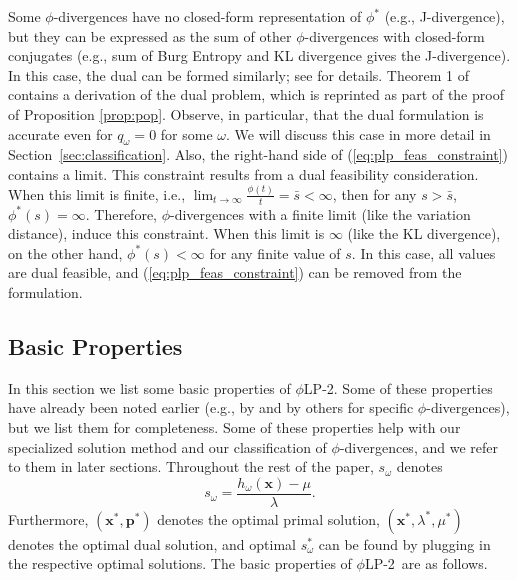 \documentclass[opre,nonblindrev]{informs3} %
\newcommand{\x}{\mathbf{x}}
\newcommand{\p}{\mathbf{p}}
\newcommand{\plp}{$\phi$LP-2}
\begin{document}
Some $\phi$-divergences have no closed-form representation of $\phi^*$ (e.g., J-divergence), but they can be expressed as the sum of other $\phi$-divergences with closed-form conjugates (e.g., sum of Burg Entropy and KL divergence gives the J-divergence). 
In this case, the dual can be formed similarly; see \cite{bental2011robust} for details.
Theorem 1 of \cite{bental2011robust} contains a derivation of the dual problem, which is reprinted as part of the proof of Proposition \ref{prop:pop}.
Observe, in particular, that the dual formulation is accurate even for $q_\omega = 0$ for some $\omega$.
We will discuss this case in more detail in Section~\ref{sec:classification}. 
Also, the right-hand side of (\ref{eq:plp_feas_constraint}) contains a limit.
This constraint results from a dual feasibility consideration. 
When this limit is finite, i.e., $\lim_{t \rightarrow \infty} \frac{\phi(t)}{t}=  \bar{s}<\infty$, then for any $s> \bar{s}$, $\phi^*(s)=\infty$. 
Therefore, $\phi$-divergences with a finite limit (like the variation distance), induce this constraint. 
When this limit is $\infty$ (like the KL divergence), on the other hand, $\phi^*(s)<\infty$ for any finite value of $s$. 
In this case, all values are dual feasible, and (\ref{eq:plp_feas_constraint}) can be removed from the formulation. 



\subsection{Basic Properties}
\label{ssec:basicprop}

In this section we list some basic properties of \plp.
Some of these properties have already been noted earlier (e.g., by \citet{bental2011robust} and by others for specific $\phi$-divergences), but we list them for completeness.
Some of these properties help with our specialized solution method and our classification of $\phi$-divergences, and we refer to them in later sections.
Throughout the rest of the paper, $s_\omega$ denotes
\begin{equation*}
	s_\omega = \frac{h_\omega(\x) - \mu}{\lambda}. %
\end{equation*}
Furthermore, $(\x^*, \p^*)$ denotes the optimal primal solution, $(\x^*, \lambda^*, \mu^*)$ denotes the optimal dual solution, and optimal $s_\omega^*$ can be found by plugging in the respective optimal solutions. 
The basic properties of \plp\ are as follows.
\end{document}
